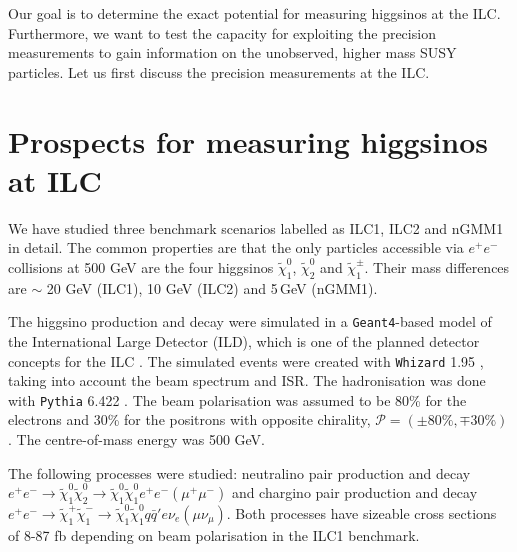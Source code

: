 \documentclass{PoS}
\newcommand{\LSP}{\widetilde{\chi}_1^0}
\newcommand{\neutralinotwo}{\widetilde{\chi}_2^0}
\newcommand{\charginoone}{\widetilde{\chi}_1^{\pm}}
\begin{document}
Our goal is to determine the exact potential for measuring higgsinos at the ILC. 
Furthermore, we want to test the capacity for exploiting the precision measurements 
to gain information on the unobserved, higher mass SUSY particles. 
Let us first discuss the precision measurements at the ILC.

\section{Prospects for measuring higgsinos at ILC}

We have studied three benchmark scenarios labelled as ILC1, ILC2 \cite{Baer:2014yta} and nGMM1 \cite{Baer:2016hfa} 
in detail. 
The common properties are that the only particles accessible via $e^+e^-$ collisions at 500 GeV 
are the four higgsinos $\LSP$, $\neutralinotwo$ and $\charginoone$. 
Their mass differences are $\sim$ 20 GeV (ILC1), 10 GeV (ILC2) and 5\,GeV (nGMM1).

The higgsino production and decay were simulated in a \texttt{Geant4}-based \cite{Agostinelli:2002hh} 
model of the International Large Detector (ILD), which is one of the planned detector concepts for the ILC \cite{TDR}. 
The simulated events were created with \texttt{Whizard} 1.95 \cite{Whizard}, 
taking into account the beam spectrum and ISR. 
The hadronisation was done with \texttt{Pythia} 6.422 \cite{PYTHIA}. 
The beam polarisation was assumed to be 80\% for the electrons and 30\% 
for the positrons with opposite chirality, $\mathcal{P}=(\pm80\%,\mp 30\%)$. The centre-of-mass energy was 500 GeV.

The following processes were studied: 
neutralino pair production and decay $e^+e^-\to \LSP \neutralinotwo \to \LSP \LSP e^+e^- (\mu^+\mu^-)$ 
and chargino pair production and decay $e^+e^-\to \widetilde{\chi}_1^+ \widetilde{\chi}_1^- \to \LSP \LSP q\bar{q}'e \nu_e (\mu \nu_\mu)$. 
Both processes have sizeable cross sections of 8-87 fb depending on beam polarisation in the ILC1 benchmark.
\end{document}
